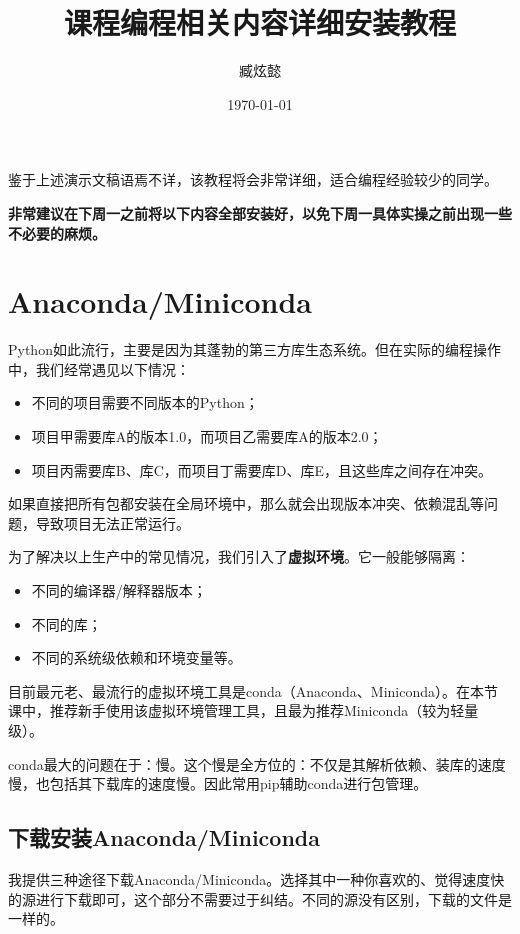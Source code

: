 \documentclass[12pt]{ctexart}
\title{\Huge\textbf{课程编程相关内容详细安装教程}}
\author{臧炫懿}
\date{\today}
\begin{document}
\maketitle

鉴于上述演示文稿语焉不详，该教程将会非常详细，适合编程经验较少的同学。

\textbf{非常建议在下周一之前将以下内容全部安装好，以免下周一具体实操之前出现一些不必要的麻烦。}

\tableofcontents

\section{Anaconda/Miniconda}

Python如此流行，主要是因为其蓬勃的第三方库生态系统。但在实际的编程操作中，我们经常遇见以下情况：
\begin{itemize}
    \item 不同的项目需要不同版本的Python；
    \item 项目甲需要库A的版本1.0，而项目乙需要库A的版本2.0；
    \item 项目丙需要库B、库C，而项目丁需要库D、库E，且这些库之间存在冲突。
\end{itemize}
如果直接把所有包都安装在全局环境中，那么就会出现版本冲突、依赖混乱等问题，导致项目无法正常运行。

为了解决以上生产中的常见情况，我们引入了\textbf{虚拟环境}。它一般能够隔离：
\begin{itemize}
    \item 不同的编译器/解释器版本；
    \item 不同的库；
    \item 不同的系统级依赖和环境变量等。
\end{itemize}

目前最元老、最流行的虚拟环境工具是conda（Anaconda、Miniconda）。在本节课中，推荐新手使用该虚拟环境管理工具，且最为推荐Miniconda（较为轻量级）。

conda最大的问题在于：慢。这个慢是全方位的：不仅是其解析依赖、装库的速度慢，也包括其下载库的速度慢。因此常用pip辅助conda进行包管理。

\subsection{下载安装Anaconda/Miniconda}

我提供三种途径下载Anaconda/Miniconda。选择其中一种你喜欢的、觉得速度快的源进行下载即可，这个部分不需要过于纠结。不同的源没有区别，下载的文件是一样的。
\end{document}
